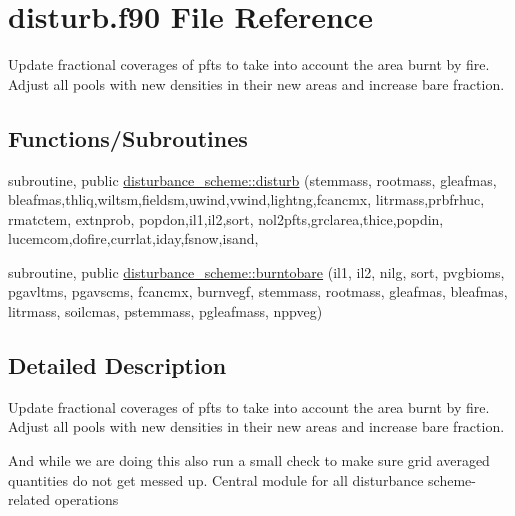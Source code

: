 \hypertarget{disturb_8f90}{}\section{disturb.\+f90 File Reference}
\label{disturb_8f90}


Update fractional coverages of pfts to take into account the area burnt by fire. Adjust all pools with new densities in their new areas and increase bare fraction.  


\subsection*{Functions/\+Subroutines}
{\bf }\par
\begin{DoxyCompactItemize}
\item 
subroutine, public \hyperlink{group__disturbance__scheme__disturb_ga0bed06e74bd06c387ae02bc545bf2a25}{disturbance\+\_\+scheme\+::disturb} (stemmass, rootmass, gleafmas, bleafmas,thliq,wiltsm,fieldsm,uwind,vwind,lightng,fcancmx, litrmass,prbfrhuc, rmatctem, extnprob, popdon,il1,il2,sort, nol2pfts,grclarea,thice,popdin, lucemcom,dofire,currlat,iday,fsnow,isand,
\end{DoxyCompactItemize}

{\bf }\par
\begin{DoxyCompactItemize}
\item 
subroutine, public \hyperlink{group__disturbance__scheme__burntobare_gae72fa0c94541c3e88a45d71f2442be9c}{disturbance\+\_\+scheme\+::burntobare} (il1, il2, nilg, sort, pvgbioms, pgavltms, pgavscms, fcancmx, burnvegf, stemmass, rootmass, gleafmas, bleafmas, litrmass, soilcmas, pstemmass, pgleafmass, nppveg)
\end{DoxyCompactItemize}



\subsection{Detailed Description}
Update fractional coverages of pfts to take into account the area burnt by fire. Adjust all pools with new densities in their new areas and increase bare fraction. 

And while we are doing this also run a small check to make sure grid averaged quantities do not get messed up. Central module for all disturbance scheme-\/related operations 